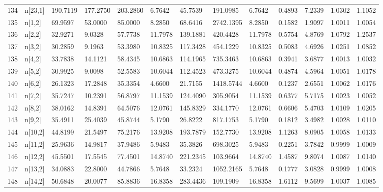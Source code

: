 \begin{table}[ht]
\begin{tabular}{rllllllllllll}
  134 & n[23,1] & 190.7119 &  177.2750 & 203.2860 &   6.7642 &    45.7539 &  191.0985 &   6.7642 &  0.4893 &  7.2339 & 1.0302 &  1.1052 \\ 
  135 & n[1,2] &  69.9597 &   53.0000 &  85.0000 &   8.2850 &    68.6416 & 2742.1395 &   8.2850 &  0.1582 &  1.9097 & 1.0011 &  1.0054 \\ 
  136 & n[2,2] &  32.9271 &    9.0328 &  57.7738 &  11.7978 &   139.1881 &  420.4428 &  11.7978 &  0.5754 &  4.8769 & 1.0792 &  1.2537 \\ 
  137 & n[3,2] &  30.2859 &    9.1963 &  53.3980 &  10.8325 &   117.3428 &  454.1229 &  10.8325 &  0.5083 &  4.6926 & 1.0251 &  1.0852 \\ 
  138 & n[4,2] &  33.7838 &   14.1121 &  58.4345 &  10.6863 &   114.1965 &  735.3463 &  10.6863 &  0.3941 &  3.6877 & 1.0013 &  1.0032 \\ 
  139 & n[5,2] &  30.9925 &    9.0098 &  52.5583 &  10.6044 &   112.4523 &  473.3275 &  10.6044 &  0.4874 &  4.5964 & 1.0051 &  1.0178 \\ 
  140 & n[6,2] &  26.1323 &   17.2848 &  35.3354 &   4.6600 &    21.7155 & 1418.5744 &   4.6600 &  0.1237 &  2.6551 & 1.0062 &  1.0176 \\ 
  141 & n[7,2] &  35.7247 &   10.2391 &  56.8797 &  11.1539 &   124.4090 &  305.9054 &  11.1539 &  0.6377 &  5.7175 & 1.0023 &  1.0052 \\ 
  142 & n[8,2] &  38.0162 &   14.8391 &  64.5076 &  12.0761 &   145.8329 &  334.1770 &  12.0761 &  0.6606 &  5.4703 & 1.0109 &  1.0205 \\ 
  143 & n[9,2] &  35.4911 &   25.4039 &  45.8744 &   5.1790 &    26.8222 &  817.1753 &   5.1790 &  0.1812 &  3.4982 & 1.0028 &  1.0110 \\ 
  144 & n[10,2] &  44.8199 &   21.5497 &  75.2176 &  13.9208 &   193.7879 &  152.7730 &  13.9208 &  1.1263 &  8.0905 & 1.0058 &  1.0133 \\ 
  145 & n[11,2] &  25.9636 &   14.9817 &  37.9486 &   5.9483 &    35.3826 &  698.3025 &   5.9483 &  0.2251 &  3.7842 & 0.9999 &  1.0009 \\ 
  146 & n[12,2] &  45.5501 &   17.5545 &  77.4501 &  14.8740 &   221.2345 &  103.9664 &  14.8740 &  1.4587 &  9.8074 & 1.0087 &  1.0140 \\ 
  147 & n[13,2] &  34.0883 &   22.8000 &  44.7866 &   5.7648 &    33.2324 & 1052.2165 &   5.7648 &  0.1777 &  3.0828 & 0.9999 &  1.0008 \\ 
  148 & n[14,2] &  50.6848 &   20.0077 &  85.8836 &  16.8358 &   283.4436 &  109.1909 &  16.8358 &  1.6112 &  9.5699 & 1.0037 &  1.0085 \\ 

\end{tabular}
\end{table}
